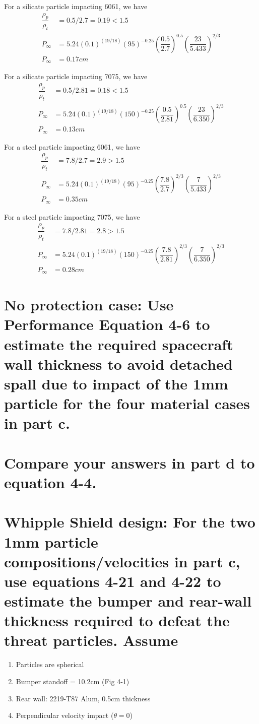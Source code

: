 \documentclass[onecolumn,10pt]{jhwhw}
\begin{document}
\noindent For a silicate particle impacting 6061, we have
\begin{align*}
\dfrac{\rho_p}{\rho_t} &= 0.5/2.7 = 0.19 < 1.5 \\
P_{\infty} &= 5.24 (0.1)^{(19/18)} (95)^{-0.25} \left(\dfrac{0.5}{2.7}\right)^{0.5} \left(\dfrac{23}{5.433}\right)^{2/3} \\
P_{\infty} &= 0.17 cm
\end{align*}

\noindent For a silicate particle impacting 7075, we have
\begin{align*}
\dfrac{\rho_p}{\rho_t} &= 0.5/2.81 = 0.18 < 1.5 \\
P_{\infty} &= 5.24 (0.1)^{(19/18)} (150)^{-0.25} \left(\dfrac{0.5}{2.81}\right)^{0.5} \left(\dfrac{23}{6.350}\right)^{2/3} \\
P_{\infty} &= 0.13 cm
\end{align*}

\noindent For a steel particle impacting 6061, we have
\begin{align*}
\dfrac{\rho_p}{\rho_t} &= 7.8/2.7 = 2.9 > 1.5 \\
P_{\infty} &= 5.24 (0.1)^{(19/18)} (95)^{-0.25} \left(\dfrac{7.8}{2.7}\right)^{2/3} \left(\dfrac{7}{5.433}\right)^{2/3} \\
P_{\infty} &= 0.35 cm
\end{align*}

\noindent For a steel particle impacting 7075, we have
\begin{align*}
\dfrac{\rho_p}{\rho_t} &= 7.8/2.81 = 2.8 > 1.5 \\
P_{\infty} &= 5.24 (0.1)^{(19/18)} (150)^{-0.25} \left(\dfrac{7.8}{2.81}\right)^{2/3} \left(\dfrac{7}{6.350}\right)^{2/3} \\
P_{\infty} &= 0.28 cm
\end{align*}

\part{No protection case: Use Performance Equation 4-6 to estimate the required spacecraft wall thickness to avoid detached spall due to impact of the 1mm particle for the four material cases in part c.}
\part{Compare your answers in part d to equation 4-4.}
\part{Whipple Shield design: For the two 1mm particle compositions/velocities in part c, use equations 4-21 and 4-22 to estimate the bumper and rear-wall thickness required to defeat the threat particles. Assume}
\begin{enumerate}
\item Particles are spherical
\item Bumper standoff = 10.2cm (Fig 4-1)
\item Rear wall: 2219-T87 Alum, 0.5cm thickness
\item Perpendicular velocity impact ($\theta=0$)
\end{enumerate}
\end{document}
